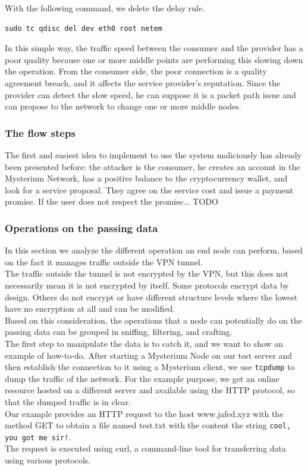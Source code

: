 \documentclass[12pt]{article}
\begin{document}
	With the following command, we delete the delay rule.\\

	\begin{lstlisting}[frame=single]
		sudo tc qdisc del dev eth0 root netem
	\end{lstlisting}

	In this simple way, the traffic speed between the consumer and the provider has a poor quality because one or more middle points are performing this slowing down the operation. From the consumer side, the poor connection is a quality agreement breach, and it affects the service provider's reputation. Since the provider can detect the slow speed, he can suppose it is a packet path issue and can propose to the network to change one or more middle nodes. 

	\subsubsection{The flow steps}
	The first and easiest idea to implement to use the system maliciously has already been presented before: the attacker is the consumer, he creates an account in the Mysterium Network, has a positive balance to the cryptocurrency wallet, and look for a service proposal. They agree on the service cost and issue a payment promise. If the user does not respect the promise...
	TODO\\

	\subsubsection{Operations on the passing data}

	In this section we analyze the different operation an end node can perform, based on the fact it manages traffic outside the VPN tunnel.\\
	The traffic outside the tunnel is not encrypted by the VPN, but this does not necessarily mean it is not encrypted by itself. Some protocols encrypt data by design. Others do not encrypt or have different structure levels where the lowest have no encryption at all and can be modified.\\ Based on this consideration, the operations that a node can potentially do on the passing data can be grouped in sniffing, filtering, and crafting.\\
	The first step to manipulate the data is to catch it, and we want to show an example of how-to-do. After starting a Mysterium Node on our test server and then establish the connection to it using a Mysterium client, we use \lstinline{tcpdump} to dump the traffic of the network. For the example purpose, we get an online resource hosted on a different server and available using the HTTP protocol, so that the dumped traffic is in clear.\\
	Our example provides an HTTP request to the host www.jafed.xyz with the method GET to obtain a file named test.txt with the content the string \lstinline{cool, you got me sir!}.\\
	The request is executed using curl, a command-line tool for transferring data using various protocols.\\
\end{document}
